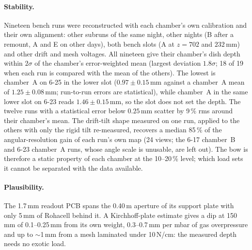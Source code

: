 \paragraph{Stability.}
Nineteen bench runs were reconstructed with each chamber's own calibration and their own alignment: other subruns of
the same night, other nights (B after a remount, A and E on other days), both bench slots (A at $z=702$ and
$232$\,mm) and other drift and mesh voltages. All nineteen give their chamber's dish depth within $2\sigma$ of the chamber's
error-weighted mean (largest deviation $1.8\sigma$; 18 of 19 when each run is compared with the mean of the others).
The lowest is chamber~A on 6-25 in the lower slot ($0.97\pm0.15$\,mm against a chamber~A mean of $1.25\pm0.08$\,mm; run-to-run errors are statistical), while
chamber~A in the same lower slot on 6-23 reads $1.46\pm0.15$\,mm, so the slot does not set the depth. The twelve runs with a statistical error below
$0.25$\,mm scatter by 9\,\% rms around their chamber's mean. The drift-tilt shape measured on one run, applied to the others with only the rigid tilt
re-measured, recovers a median 85\,\% of the angular-resolution gain of each run's own map (24 views; the 6-17 chamber~B and
6-23 chamber~A runs, whose angle scale is unusable, are left out). The bow is therefore a
static property of each chamber at the 10--20\,\% level; which load sets it cannot be separated with the data available.

\paragraph{Plausibility.}
The 1.7\,mm readout PCB spans the 0.40\,m aperture of its support plate with only 5\,mm of Rohacell behind it. A
Kirchhoff-plate estimate gives a dip at 150\,mm of 0.1--0.25\,mm from its own weight, 0.3--0.7\,mm per mbar of gas
overpressure and up to $\sim$1\,mm from a mesh laminated under 10\,N/cm: the measured depth needs no exotic load.

